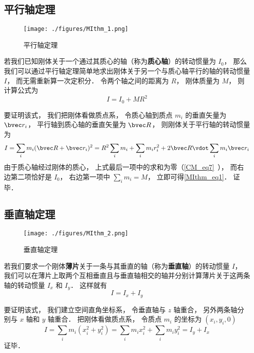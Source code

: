 

\subsection{平行轴定理}
\begin{figure}[ht]
\centering
\texttt{[image: ./figures/MIthm\_1.png]}
\caption{平行轴定理} \label{MIthm_fig1}
\end{figure}

若我们已知刚体关于一个通过其质心的轴（称为\textbf{质心轴}）的转动惯量为 $I_0$， 那么我们可以通过平行轴定理简单地求出刚体关于另一个与质心轴平行的轴的转动惯量 $I$， 而无需重新算一次定积分． 令两个轴之间的距离为 $R$， 刚体质量为 $M$， 则计算公式为%
\begin{equation}\label{MIthm_eq1}
I = I_0 + MR^2
\end{equation}

要证明该式， 我们把刚体看做质点系， 令质心轴到质点 $m_i$ 的垂直矢量为 $\bvec r_i$， 平行轴到质心轴的垂直矢量为 $\bvec R$， 则刚体关于平行轴的转动惯量为
\begin{equation}
I = \sum_i m_i (\bvec R + \bvec r_i)^2 = R^2\sum_i m_i + \sum_i m_i r_i^2 + 2\bvec R \vdot \sum_i m_i \bvec r_i
\end{equation}
由于质心轴经过刚体的质心， 上式最后一项中的求和为零（\autoref{CM_eq7}~）， 而右边第二项恰好是 $I_0$， 右边第一项中 $\sum_i m_i = M$， 立即可得\autoref{MIthm_eq1}． 证毕．


\subsection{垂直轴定理}
\begin{figure}[ht]
\centering
\texttt{[image: ./figures/MIthm\_2.png]}
\caption{垂直轴定理} \label{MIthm_fig2}
\end{figure}
若我们要求一个刚体\textbf{薄片}关于一条与其垂直的轴（称为\textbf{垂直轴}）的转动惯量 $I$， 我们可以在薄片上取两个互相垂直且与垂直轴相交的轴并分别计算薄片关于这两条轴的转动惯量 $I_x$ 和 $I_y$． 这样就有
\begin{equation}\label{MIthm_eq2}
I = I_x + I_y
\end{equation}

要证明该式， 我们建立空间直角坐标系， 令垂直轴与 $z$ 轴重合， 另外两条轴分别与 $x$ 轴和 $y$ 轴重合． 把刚体看做质点系， 令质点 $m_i$ 的坐标为 $(x_i, y_i, 0)$
\begin{equation}
I = \sum_i m_i (x_i^2 + y_i^2) = \sum_i m_i x_i^2 + \sum_i m_i y_i^2 = I_y + I_x
\end{equation}
证毕．

